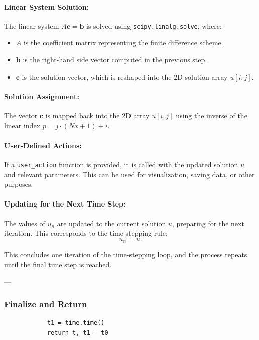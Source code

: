 \documentclass{article}
\begin{document}
		\paragraph{Linear System Solution:}
		The linear system $A \mathbf{c} = \mathbf{b}$ is solved using \texttt{scipy.linalg.solve}, where:
		\begin{itemize}
			\item $A$ is the coefficient matrix representing the finite difference scheme.
			\item $\mathbf{b}$ is the right-hand side vector computed in the previous step.
			\item $\mathbf{c}$ is the solution vector, which is reshaped into the 2D solution array $u[i, j]$.
		\end{itemize}
		
		\paragraph{Solution Assignment:}
		The vector $\mathbf{c}$ is mapped back into the 2D array $u[i, j]$ using the inverse of the linear index $p = j \cdot (Nx + 1) + i$.
		
		\paragraph{User-Defined Actions:}
		If a \texttt{user\_action} function is provided, it is called with the updated solution $u$ and relevant parameters. This can be used for visualization, saving data, or other purposes.
		
		\paragraph{Updating for the Next Time Step:}
		The values of $u_n$ are updated to the current solution $u$, preparing for the next iteration. This corresponds to the time-stepping rule:
		\[
		u_n = u.
		\]
		
		This concludes one iteration of the time-stepping loop, and the process repeats until the final time step is reached.
			
		---
	
		\subsubsection{Finalize and Return}
		\begin{lstlisting}
			t1 = time.time()
			return t, t1 - t0
		\end{lstlisting}
		
\end{document}
